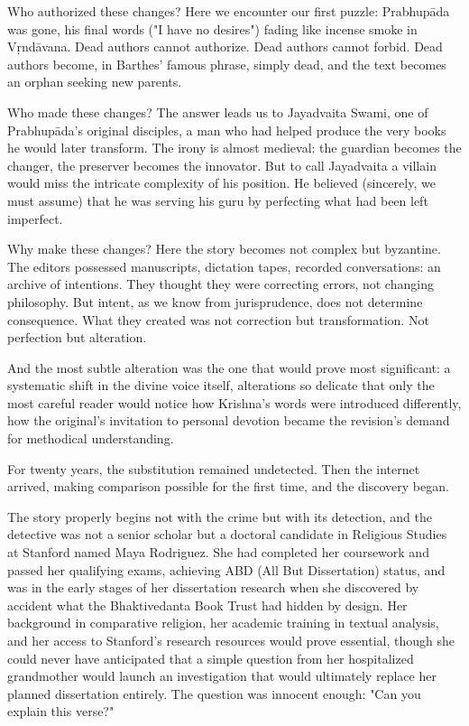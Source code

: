 \documentclass[12pt,twoside]{book}
\begin{document}
Who authorized these changes? Here we encounter our first puzzle: Prabhupāda was gone, his final words ("I have no desires") fading like incense smoke in Vṛndāvana. Dead authors cannot authorize. Dead authors cannot forbid. Dead authors become, in Barthes' famous phrase, simply dead, and the text becomes an orphan seeking new parents.

Who made these changes? The answer leads us to Jayadvaita Swami, one of Prabhupāda's original disciples, a man who had helped produce the very books he would later transform. The irony is almost medieval: the guardian becomes the changer, the preserver becomes the innovator. But to call Jayadvaita a villain would miss the intricate complexity of his position. He believed (sincerely, we must assume) that he was serving his guru by perfecting what had been left imperfect.

Why make these changes? Here the story becomes not complex but byzantine. The editors possessed manuscripts, dictation tapes, recorded conversations: an archive of intentions. They thought they were correcting errors, not changing philosophy. But intent, as we know from jurisprudence, does not determine consequence. What they created was not correction but transformation. Not perfection but alteration.

And the most subtle alteration was the one that would prove most significant: a systematic shift in the divine voice itself, alterations so delicate that only the most careful reader would notice how Krishna's words were introduced differently, how the original's invitation to personal devotion became the revision's demand for methodical understanding.

For twenty years, the substitution remained undetected. Then the internet arrived, making comparison possible for the first time, and the discovery began.

The story properly begins not with the crime but with its detection, and the detective was not a senior scholar but a doctoral candidate in Religious Studies at Stanford named Maya Rodriguez. She had completed her coursework and passed her qualifying exams, achieving ABD (All But Dissertation) status, and was in the early stages of her dissertation research when she discovered by accident what the Bhaktivedanta Book Trust had hidden by design. Her background in comparative religion, her academic training in textual analysis, and her access to Stanford's research resources would prove essential, though she could never have anticipated that a simple question from her hospitalized grandmother would launch an investigation that would ultimately replace her planned dissertation entirely. The question was innocent enough: "Can you explain this verse?"
\end{document}
